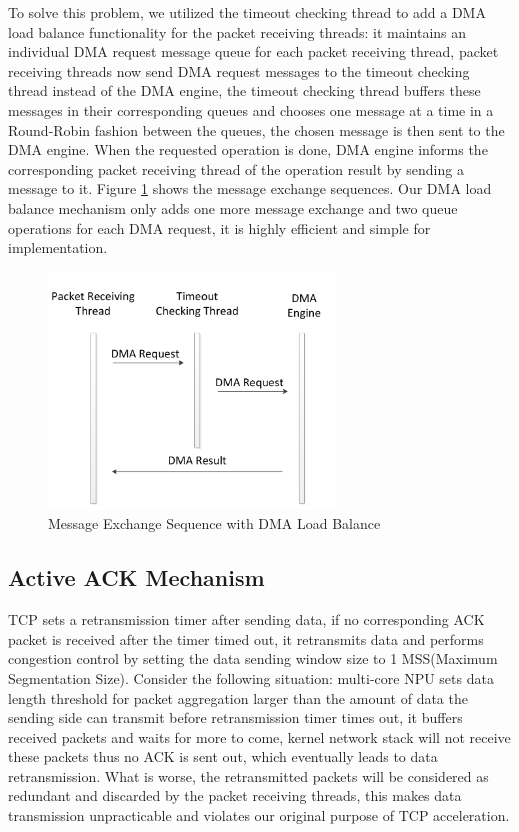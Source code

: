 \documentclass[conference]{IEEEtran}
\begin{document}
To solve this problem, we utilized the timeout checking thread to add a DMA load balance functionality for the packet receiving threads: it maintains an individual DMA request message queue for each packet receiving thread, packet receiving threads now send DMA request messages to the timeout checking thread instead of the DMA engine, the timeout checking thread buffers these messages in their corresponding queues and chooses one message at a time in a Round-Robin fashion between the queues, the chosen message is then sent to the DMA engine. When the requested operation is done, DMA engine informs the corresponding packet receiving thread of the operation result by sending a message to it. Figure \ref{dma balance seq} shows the message exchange sequences. Our DMA load balance mechanism only adds one more message exchange and two queue operations for each DMA request, it is highly efficient and simple for implementation.
\begin{figure}[!t]
\centering
\includegraphics[width=3.0in]{dma_balance_seq}
\caption{Message Exchange Sequence with DMA Load Balance}
\label{dma balance seq}
\end{figure}
\subsection{Active ACK Mechanism}
TCP sets a retransmission timer after sending data, if no corresponding ACK packet is received after the timer timed out, it retransmits data and performs congestion control by setting the data sending window size to 1 MSS(Maximum Segmentation Size). Consider the following situation: multi-core NPU sets data length threshold for packet aggregation larger than the amount of data the sending side can transmit before retransmission timer times out, it buffers received packets and waits for more to come, kernel network stack will not receive these packets thus no ACK is sent out, which eventually leads to data retransmission. What is worse, the retransmitted packets will be considered as redundant and discarded by the packet receiving threads, this makes data transmission unpracticable and violates our original purpose of TCP acceleration.
\end{document}
